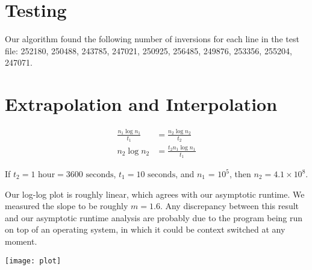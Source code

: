 \documentclass[12pt,letterpaper]{article}
\begin{document}
\section{Testing}
Our algorithm found the following number of inversions for each line in the test
file: 252180, 250488, 243785, 247021, 250925, 256485, 249876, 253356, 255204,
247071.

\section{Extrapolation and Interpolation}

\begin{align*}
  \frac{n_1 \log n_1}{t_1} &= \frac{n_2 \log n_2}{t_2} \\
  n_2 \log n_2 &= \frac{t_2 n_1 \log n_1}{t_1}
\end{align*}

If $t_2 = 1 \text{ hour} = 3600 \text{ seconds}$, $t_1 = 10 \text{ seconds}$,
and $n_1$ = $10^5$, then $n_2 = 4.1 \times 10^8$.

Our log-log plot is roughly linear, which agrees with our asymptotic runtime.
We measured the slope to be roughly $m = 1.6$. Any discrepancy between this
result and our asymptotic runtime analysis are probably due to the program being
run on top of an operating system, in which it could be context switched at any
moment.

\texttt{[image: plot]}
\end{document}
